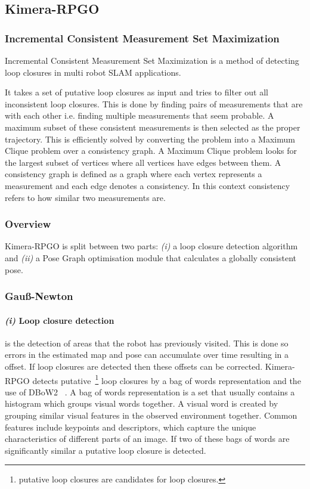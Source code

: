 \documentclass[11pt,a4paper]{article}
\begin{document}
\subsection{Kimera-RPGO}

\subsubsection{Incremental Consistent Measurement Set Maximization} \label{pre:PCM}
Incremental Consistent Measurement Set Maximization is a  method of detecting loop closures in multi robot SLAM applications. 

It takes a set of putative loop closures as input and tries to filter out all inconsistent loop closures. 
This is done by finding pairs of measurements that are with each other i.e. finding multiple measurements that seem probable. 
A maximum subset of these consistent measurements is then selected as the proper trajectory.
This is efficiently solved by converting the problem into a Maximum Clique problem over a consistency graph. 
A Maximum Clique problem looks for the largest subset of vertices where all vertices have edges between them. 
A consistency graph is defined as a graph where each vertex represents a measurement and each edge denotes a consistency.
In this context consistency refers to how similar two measurements are.
\subsubsection {Overview}
Kimera-RPGO is split between two parts: \textit{(i)} a loop closure detection algorithm and \textit{(ii)} a Pose Graph optimisation module that calculates a globally consistent pose.

\subsubsection{Gauß-Newton}

\paragraph{\textit{(i)} Loop closure detection}
is the detection of areas that the robot has previously visited.
This is done so errors in the estimated map and pose can accumulate over time resulting in a offset.
If loop closures are detected then these offsets can be corrected. 
Kimera-RPGO detects putative~\footnote{putative loop closures are candidates for loop closures.} loop closures by a bag of words representation and the use of DBoW2~\cite{dbow2} . 
A bag of words representation is a set that usually contains a histogram which groups visual words together. 
A visual word is created by grouping similar visual features in the observed environment together.
Common features include keypoints and descriptors, which capture the unique characteristics of different parts of an image. 
If two of these bags of words are significantly similar a putative loop closure is detected. 
\end{document}
